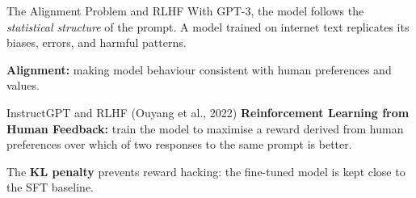 \documentclass[11pt,aspectratio=169,professionalfonts]{beamer}
\begin{document}
%
%
\begin{frame}{The Alignment Problem and RLHF}
  With GPT-3, the model follows the \emph{statistical structure} of the prompt.
  A model trained on internet text replicates its biases, errors,
  and harmful patterns.

  \textbf{Alignment:} making model behaviour consistent with human
  preferences and values.

  \begin{block}{InstructGPT and RLHF (Ouyang et al., 2022)}
    \textbf{Reinforcement Learning from Human Feedback:}
    train the model to maximise a reward derived from human preferences
    over which of two responses to the same prompt is better.
  \end{block}

  \begin{center}
  \end{center}

  The \textbf{KL penalty} prevents reward hacking:
  the fine-tuned model is kept close to the SFT baseline.
\end{frame}
%
%
\end{document}
